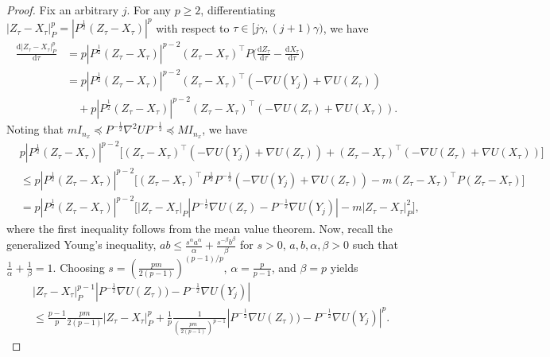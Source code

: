 \documentclass[11pt]{article}
\theoremstyle{plain}
\theoremstyle{definition}
\theoremstyle{remark}
\begin{document}
\begin{proof}
Fix an arbitrary $j$.
For any $p \geq 2$, 
differentiating $|Z_{\tau} - X_{\tau}|_P^p = |P^{\frac{1}{2}}(Z_{\tau} - X_{\tau})|^p$ with respect to ${\tau} \in [j\gamma, (j+1)\gamma)$, we have
\begin{align*}
\frac{\mathrm{d} |Z_{\tau} - X_{\tau}|_P^p}{\mathrm{d}{\tau}} &= p|P^{\frac{1}{2}}(Z_{\tau} - X_{\tau})|^{p-2}(Z_{\tau} - X_{\tau})^\top P \bigg (
\frac{\mathrm{d} Z_{\tau}}{\mathrm{d} {\tau}} - \frac{\mathrm{d} X_{\tau}}{\mathrm{d} {\tau}}
\bigg )
\\&= p|P^{\frac{1}{2}}(Z_{\tau} - X_{\tau})|^{p-2} (Z_{\tau} - X_{\tau})^\top ( - \nabla U (Y_j) +  \nabla U(Z_{\tau}))
\\& \quad + p|P^{\frac{1}{2}}(Z_{\tau} - X_{\tau})|^{p-2} (Z_{\tau} - X_{\tau})^\top (  - \nabla U(Z_{\tau}) +  \nabla U(X_{\tau})).
\end{align*}
Noting that $m  I_{n_x} \preceq P^{-\frac{1}{2}}\nabla^2 U P^{-\frac{1}{2}}  \preceq  M  I_{n_x}$, we have
\begin{equation}\nonumber
\begin{split}
&p|P^{\frac{1}{2}}(Z_{\tau} - X_{\tau})|^{p-2}\big[ (Z_{\tau} - X_{\tau})^\top ( - \nabla U (Y_j) + \nabla U(Z_{\tau}))
+ (Z_{\tau} - X_{\tau})^\top (  -  \nabla U(Z_{\tau}) +  \nabla U(X_{\tau}))\big]\\
&\leq p|P^{\frac{1}{2}}(Z_{\tau} - X_{\tau})|^{p-2} \big[(Z_{\tau} - X_{\tau})^\top P^{\frac{1}{2}} P^{-\frac{1}{2}}( - \nabla U (Y_j) +  \nabla U(Z_{\tau}))
- m (Z_{\tau} - X_{\tau})^\top P (Z_{\tau} - X_{\tau})\big]\\
&=p|P^{\frac{1}{2}}(Z_{\tau} - X_{\tau})|^{p-2}\big[  |Z_{\tau} - X_{\tau}|_P  |  P^{-\frac{1}{2}} \nabla U(Z_{\tau}) -P^{-\frac{1}{2}} \nabla U (Y_j) |
- m  |Z_{\tau} - X_{\tau}|_P^2\big],
\end{split}
\end{equation}
where the first inequality follows from the mean value theorem.
Now, recall the generalized Young's inequality, $ab \leq \frac{s^\alpha a^\alpha}{\alpha} + \frac{s^{-\beta}b^\beta}{\beta}$ for $s>0$, $a,b,\alpha,\beta>0$ such that $\frac{1}{\alpha}+\frac{1}{\beta}=1$.
Choosing $s=(\frac{pm}{2(p-1)})^{(p-1)/p}$, $\alpha=\frac{p}{p-1}$, and $\beta=p$ yields
\begin{align*}
&|Z_{\tau} - X_{\tau}|_P^{p-1}  |  P^{-\frac{1}{2}} \nabla U(Z_{\tau})) -P^{-\frac{1}{2}} \nabla U (Y_j) | \\
&\leq \frac{p-1}{p}\frac{pm}{2(p-1)} | Z_{\tau} - X_{\tau}|_P^p  + \frac{1}{p}\frac{1}{(\frac{pm}{2(p-1)})^{p-1}}|  P^{-\frac{1}{2}} \nabla U(Z_{\tau})) -P^{-\frac{1}{2}} \nabla U (Y_j) |^p.

\end{align*}
\end{proof}
\end{document}
